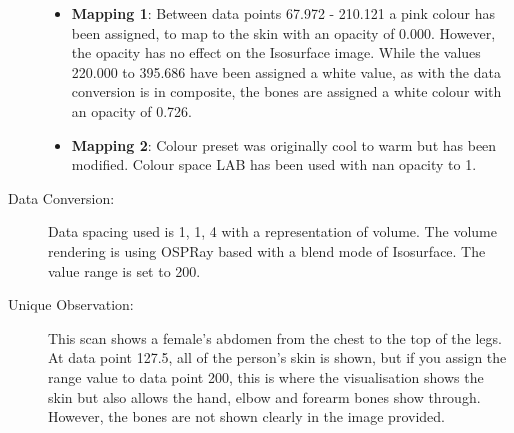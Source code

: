\begin{description}
	\begin{itemize}
		\tightlist
		\item
		\textbf{Mapping 1}: 
		\hfill \break
			Between data points 67.972 - 210.121 a pink colour has been assigned, to map to the skin with an opacity of 0.000. However, the opacity has no effect on the Isosurface image. While the values 220.000 to 395.686 have been assigned a white value, as with the data conversion is in composite, the bones are assigned a white colour with an opacity of 0.726.
	\end{itemize}
	
	\begin{itemize}
		\tightlist
		\item
		\textbf{Mapping 2}:
		\hfill \break
			Colour preset was originally cool to warm but has been modified. Colour space LAB has been used with nan opacity to 1. 
	\end{itemize}
	
	\item[Data Conversion:] 
	\hfill \break
		Data spacing used is 1, 1, 4 with a representation of volume. The volume rendering is using OSPRay based with a blend mode of Isosurface. The value range is set to 200.
	
	\item[Unique Observation:]
	\hfill \break
		This scan shows a female's abdomen from the chest to the top of the legs. At data point 127.5, all of the person's skin is shown, but if you assign the range value to data point 200, this is where the visualisation shows the skin but also allows the hand, elbow and forearm bones show through. However, the bones are not shown clearly in the image provided. 
	
\end{description}
